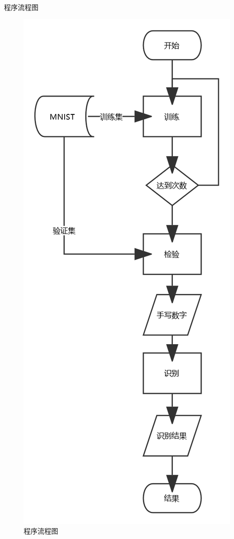 \documentclass[newPxFont,sthlmFooter]{beamer}
\begin{document}
\begin{frame}{程序流程图}

\begin{figure}
	\centering
	\includegraphics[height=0.7\textheight]{screenshot001}
	\caption{程序流程图}
	\label{fig:screenshot001}
\end{figure}

\end{frame}
\end{document}
